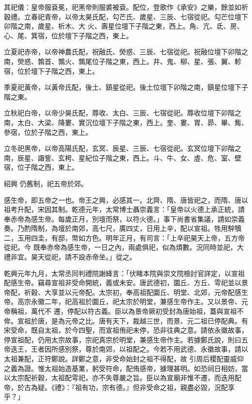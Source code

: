 \begin{pinyinscope}
 其祀儀：皇帝服袞冕，祀黑帝則服裘被袞。配位，登歌作《承安》之樂，餘並如祈穀禮。立春祀青帝，以帝太昊氏配，勾芒氏、歲星、三辰、七宿從祀。勾芒位壇下卯階之南，歲星、析木、大
 火、壽星位壇下子階之東，西上。角、亢、氐、房、心、尾、箕宿，位於壇下子階之西，東上。



 立夏祀赤帝，以帝神農氏配，祝融氏、熒惑、三辰、七宿從祀。祝融位壇下卯階之南，熒惑、鶉首、鶉火、鶉尾位子階之東，西上。井、鬼、柳、星、張、翼、軫宿，位於壇下子階之西，東上。



 季夏祀黃帝，以黃帝氏配，後土、鎮星從祀。後土位壇下卯階之南，鎮星位壇下子階之東。



 立秋祀白帝，以帝少昊氏配，蓐收、太白、三辰、七宿從祀。蓐收位壇下卯階之南，太白、大梁、降婁、實沉位壇下子階之東，西上。奎、婁、胃、昴、畢、觜、參宿，位於子階之西，東上。



 立冬祀黑帝，以帝高陽氏配，玄冥、辰星、三辰、七宿從祀。玄冥位壇下卯階之南，辰星、諏訾、玄枵、星紀位子階之東，西上。斗、牛、女、虛、危、室、壁宿，位子階之西，東上。



 紹興
 仍舊制，祀五帝於郊。



 感生帝，即五帝之一也。帝王之興，必感其一。北齊、隋、唐皆祀之，而隋、唐以祖考升配，宋因其制。乾德元年，太常博士聶崇義言：「皇帝以火德上承正統，請奉赤帝為感生帝。每歲正月，別壇而祭，以符火德。」事下尚書省集議，請如崇義奏。乃酌隋制，為壇於南郊，高七尺，廣四丈，日用上辛，配以宣祖。牲用騂犢二，玉用四圭，有邸，幣如方色。明年正月，有司言：「上辛祀昊天上帝，五方帝從祀。今
 既奉赤帝為感生帝，一日之內，兩處俱祀，似為煩數。況同時並祀，大禮非宜。昊天從祀，請不設赤帝坐。」從之。



 乾興元年九月，太常丞同判禮院謝絳言：「伏睹本院與崇文院檢討官詳定，以宣祖配感生帝。竊尋宣祖非受命開統，義或未安。唐武德初，圜丘、方丘、雩祀並以景帝配，祈穀、大享並以元帝配。太宗初，奉高祖配圜丘、明堂、北郊，元帝配感生帝。高宗永徽二年，祀高祖於圜丘，祀太宗於明堂，兼感生帝作主。又以景帝、元帝稱祖，萬代不
 遷，停配以符古義。臣以為景帝厥初受封為唐始祖，蓋與宣祖不侔。宣祖於唐，是為元帝之比。唐有天下，裁越三世，而景、元二祖已停配典。有宋受命，既自太祖，於今四聖，而宣祖侑祀未停，恐非往典之意。請依永徽故事，停宣祖配，仍用太宗故事，宗祀真宗於明堂，兼感生帝作主。若據鄭氏說，則曰五帝迭王，王者因所感別祭，尊於南郊，以祖配之。今若不用武德、永徽故事，請以太祖兼配，正符鄭說。詳鄭之意，非受命始封之祖不得配，故
 引周后稷配靈威仰之義為證。惟太祖始造基業，躬受符命，配侑感帝，據理甚明。如恐祠日相妨，當以太宗配祈穀，太祖配雩祀，亦不失尊嚴之旨。臣以為宣廟非惟不遷，而迭用配帝，於古為疑。《禮》：『祖有功，宗有德。』但非受命之祖，親盡必毀，況配享乎？」




\end{pinyinscope}
